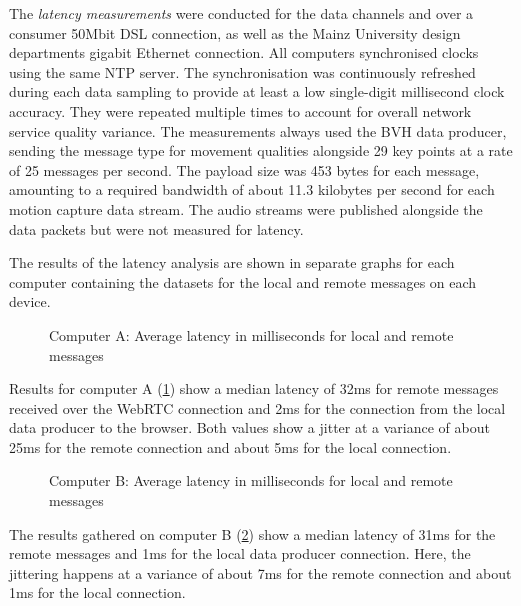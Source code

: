 The \emph{latency measurements} were conducted for the data channels and over a consumer 50Mbit \ac{DSL} connection, as well as the Mainz University design department\textquotesingle s gigabit Ethernet connection.
All computers synchronised clocks using the same \ac{NTP} server.
The synchronisation was continuously refreshed during each data sampling to provide at least a low single-digit millisecond clock accuracy.
They were repeated multiple times to account for overall network service quality variance.
The measurements always used the \ac{BVH} data producer, sending the message type for movement qualities alongside 29 key points at a rate of 25 messages per second.
The payload size was 453 bytes for each message, amounting to a required bandwidth of about 11.3 kilobytes per second for each motion capture data stream.
The audio streams were published alongside the data packets but were not measured for latency.

The results of the latency analysis are shown in separate graphs for each computer containing the datasets for the local and remote messages on each device.

\begin{figure}[h]
\centering

\caption[Message latency on Computer A]{Computer A: Average latency in milliseconds for local and remote messages\protect}
\label{fig:latencyComputerA}
\end{figure}

Results for computer A (\ref{fig:latencyComputerA}) show a median latency of 32ms for remote messages received over the WebRTC connection and 2ms for the connection from the local data producer to the browser.
Both values show a jitter at a variance of about 25ms for the remote connection and about 5ms for the local connection.

\begin{figure}[h]
\centering

\caption[Message latency on Computer B]{Computer B: Average latency in milliseconds for local and remote messages\protect}
\label{fig:latencyComputerB}
\end{figure}

The results gathered on computer B (\ref{fig:latencyComputerB}) show a median latency of 31ms for the remote messages and 1ms for the local data producer connection.
Here, the jittering happens at a variance of about 7ms for the remote connection and about 1ms for the local connection.

